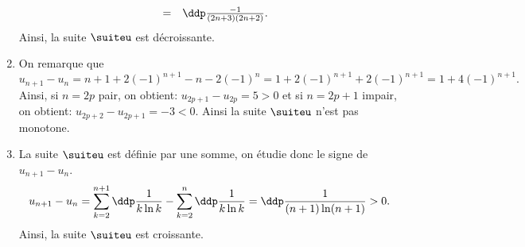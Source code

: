 \begin{correction}
\begin{enumerate}
$$\begin{array}{lll}
&=& \ddp\frac{-1}{(2n+3)(2n+2)}.
\end{array}$$
Ainsi, la suite $\suiteu$ est d\'ecroissante.
\item 
On remarque que
$$u_{n+1}-u_n=n+1+2(-1)^{n+1}-n-2(-1)^n=1+2(-1)^{n+1}+2(-1)^{n+1}=1+4(-1)^{n+1}.$$
Ainsi, si $n=2p$ pair, on obtient: $u_{2p+1}-u_{2p}=5>0$ et si $n=2p+1$ impair, on obtient: $u_{2p+2}-u_{2p+1}=-3<0$. Ainsi la suite $\suiteu$ n'est pas monotone.
\item La suite $\suiteu$ est d\'efinie par une somme, on \'etudie donc le signe de $u_{n+1}-u_n$.
$$u_{n+1}-u_n = \sum\limits_{k=2}^{n+1}\ddp\frac{1}{k \ln k}-\sum\limits_{k=2}^{n}\ddp\frac{1}{k \ln k} = \ddp\frac{1}{(n+1) \ln (n+1)} > 0.$$
Ainsi, la suite $\suiteu$ est croissante.
\end{enumerate}
\end{correction}